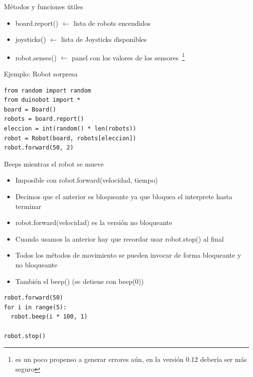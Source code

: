 \documentclass{beamer}[10]
\begin{document}
\begin{frame}[fragile]{Métodos y funciones útiles}
	\begin{itemize}
		\item board.report() $\leftarrow$ lista de robots encendidos
		\item joysticks() $\leftarrow$ lista de Joysticks disponibles
		\item robot.senses() $\leftarrow$ panel con los valores de los sensores~\footnote{es un poco propenso a generar errores aún, en la versión 0.12 debería ser más seguro}
	\end{itemize}\pause
	\begin{block}{Ejemplo: Robot sorpresa}
		\begin{lstlisting}
from random import random
from duinobot import *
board = Board()
robots = board.report()
eleccion = int(random() * len(robots))
robot = Robot(board, robots[eleccion])
robot.forward(50, 2)
		\end{lstlisting}
	\end{block}
\end{frame}
\begin{frame}
	\begin{center}
	\end{center}
\end{frame}
\begin{frame}[fragile]{Beeps mientras el robot se mueve}
	\begin{itemize}[<+->]
		\item Imposible con robot.forward(velocidad, tiempo)
		\item Decimos que el anterior es bloqueante ya que bloquea el interprete hasta terminar
		\item robot.forward(velocidad) es la versión no bloqueante
		\item Cuando usamos la anterior hay que recordar usar robot.stop() al final
		\item Todos los métodos de movimiento se pueden invocar de forma bloqueante y no bloqueante
		\item También el beep() (se detiene con beep(0))
	\end{itemize}\pause
	\begin{block}{}
		\begin{lstlisting}
robot.forward(50)
for i in range(5):
  robot.beep(i * 100, 1)

robot.stop()
		\end{lstlisting}
	\end{block}
\end{frame}
\end{document}
